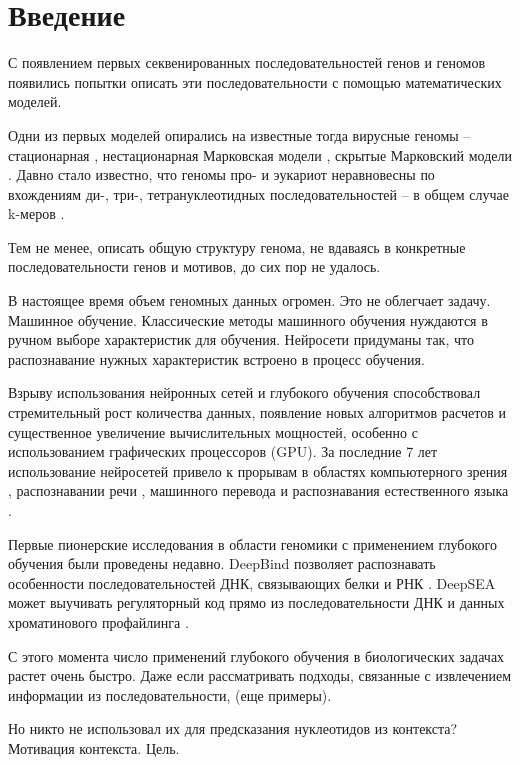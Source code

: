 \section{Введение}

С появлением первых секвенированных последовательностей генов и геномов появились попытки описать эти последовательности с помощью математических моделей.

Одни из первых моделей опирались на известные тогда вирусные геномы -- стационарная \cite{garden_markov_1980}, нестационарная Марковская модели \cite{tavare_codon_1989}, скрытые Марковский модели \cite{churchill_stochastic_1989}. 
Давно стало известно, что геномы про- и эукариот неравновесны по вхождениям ди-, три-, тетрануклеотидных последовательностей -- в общем случае k-меров \cite{phillips_mono-_1987}. 

Тем не менее, описать общую структуру генома, не вдаваясь в конкретные последовательности генов и мотивов, до сих пор не удалось.

В настоящее время объем геномных данных огромен. Это не облегчает задачу. Машинное обучение. Классические методы машинного обучения нуждаются в ручном выборе характеристик для обучения. Нейросети придуманы так, что распознавание нужных характеристик встроено в процесс обучения.

Взрыву использования нейронных сетей и глубокого обучения способствовал стремительный рост количества данных, появление новых алгоритмов расчетов и существенное увеличение вычислительных мощностей, особенно с использованием графических процессоров (GPU).
За последние 7 лет использование нейросетей привело к прорывам в областях компьютерного зрения \cite{krizhevsky_imagenet_2012, girshick_region-based_2016, long_fully_2015}, распознавании речи \cite{hannun_deep_2014}, машинного перевода и распознавания естественного языка \cite{wu_googles_2016}.

Первые пионерские исследования в области геномики с применением глубокого обучения были проведены недавно. DeepBind позволяет распознавать особенности последовательностей ДНК, связывающих белки и РНК \cite{alipanahi_predicting_2015}. DeepSEA может выучивать регуляторный код  прямо из последовательности ДНК и данных хроматинового профайлинга \cite{zhou_predicting_2015}. 

С этого момента число применений глубокого обучения в биологических задачах растет очень быстро. Даже если рассматривать подходы, связанные с извлечением информации из последовательности, (еще примеры).

Но никто не использовал их для предсказания нуклеотидов из контекста? Мотивация контекста. Цель.
